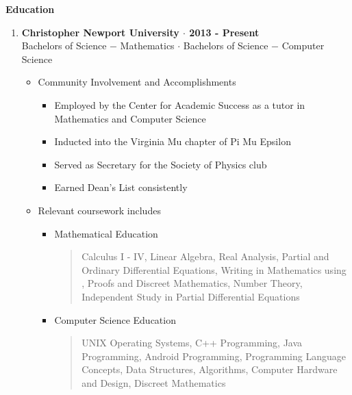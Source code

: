 \noindent\textbf{\large Education}
\begin{enumerate}[label={\Roman*}.]
\item \textbf{Christopher Newport University $\cdot$ 2013 - Present}\\
Bachelors of Science $-$ Mathematics $\cdot$ Bachelors of Science $-$ Computer Science
\begin{itemize}
\item Community Involvement and Accomplishments
\begin{itemize}
\item Employed by the Center for Academic Success as a tutor in Mathematics and Computer Science
\item Inducted into the Virginia Mu chapter of Pi Mu Epsilon
\item Served as Secretary for the Society of Physics club
\item Earned Dean's List consistently
\end{itemize}
\item Relevant coursework includes
\begin{itemize}
\item Mathematical Education
\begin{quote}
Calculus I - IV, Linear Algebra, Real Analysis, Partial and Ordinary Differential Equations, Writing in
Mathematics using , Proofs and Discreet Mathematics, Number Theory, Independent Study in
Partial Differential Equations
\end{quote}
\item Computer Science Education
\begin{quote}
UNIX Operating Systems, C++ Programming, Java Programming, Android Programming, Programming Language
Concepts, Data Structures, Algorithms, Computer Hardware and Design, Discreet Mathematics
\end{quote}
\end{itemize}
\end{itemize}
\end{enumerate}
